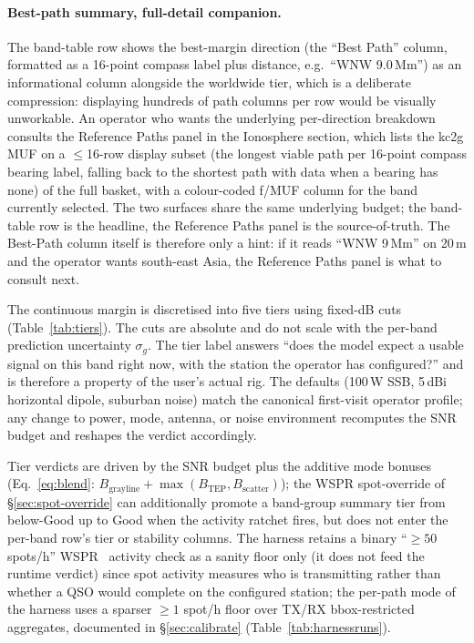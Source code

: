 \documentclass[11pt,a4paper]{article}
\begin{document}
\paragraph{Best-path summary, full-detail companion.}  The
band-table row shows the best-margin direction (the
``Best Path'' column, formatted as a 16-point compass label
plus distance, e.g.\ ``WNW 9.0\,Mm'') as an informational
column alongside the worldwide tier, which is a deliberate
compression: displaying hundreds of path columns per row would be
visually unworkable.  An operator who wants the underlying
per-direction breakdown consults the Reference Paths panel in
the Ionosphere section, which lists the kc2g MUF on a
$\le$16-row
display subset (the longest viable path per 16-point compass
bearing label, falling back to the shortest path with data when
a bearing has none) of the full basket, with a colour-coded
f/MUF column for the band
currently selected.  The two surfaces share the same underlying
budget; the band-table row is the headline, the Reference Paths
panel is the source-of-truth.  The Best-Path column itself is
therefore only a hint: if it reads ``WNW 9\,Mm'' on 20\,m and
the operator wants south-east Asia, the Reference Paths panel
is what to consult next.

The continuous margin is discretised into five tiers using
fixed-dB cuts (Table~\ref{tab:tiers}).  The cuts are absolute and
do not scale with the per-band prediction uncertainty
$\sigma_g$.  The tier label answers ``does the model expect a
usable signal on this band right now, with the station the
operator has configured?'' and is therefore a property of the
user's actual rig.  The defaults (100\,W SSB, 5\,dBi horizontal
dipole, suburban noise) match the canonical first-visit operator
profile; any change to power, mode, antenna, or noise environment
recomputes the SNR budget and reshapes the verdict accordingly.

Tier verdicts are driven by the SNR budget plus the additive
mode bonuses (Eq.~\ref{eq:blend}: $B_{\text{grayline}} +
\max(B_{\text{TEP}}, B_{\text{scatter}})$); the WSPR
spot-override of \S\ref{sec:spot-override} can additionally
promote a band-group summary tier from below-Good up to Good
when the activity ratchet fires, but does not enter the per-band
row's tier or stability columns.  The harness retains a binary
``$\geq 50$ spots/h'' WSPR~\cite{wsprlive} activity check as a
sanity floor only (it does not feed the runtime verdict) since
spot activity measures who is transmitting rather than whether a
QSO would complete on the configured station; the per-path mode
of the harness uses a sparser $\geq 1$ spot/h floor over TX/RX
bbox-restricted aggregates, documented in \S\ref{sec:calibrate}
(Table~\ref{tab:harnessruns}).
\end{document}
